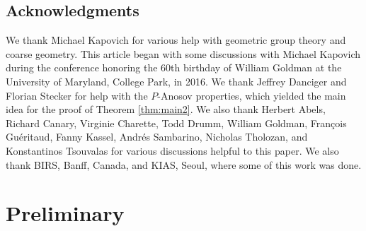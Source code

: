\subsection{Acknowledgments}
We thank Michael Kapovich for various help with geometric group theory and coarse geometry. This article began with some discussions with Michael Kapovich during the conference honoring the 60th birthday of William Goldman at the University of Maryland, College Park, in 2016. 
We thank Jeffrey Danciger and Florian Stecker for help with the $P$-Anosov properties, which yielded the main idea for the proof of Theorem \ref{thm:main2}. 
%
%
We also thank Herbert Abels, Richard Canary, Virginie Charette, Todd Drumm,
William Goldman, Fran\c{c}ois Gu\'eritaud, Fanny Kassel, 
Andr\'es Sambarino, Nicholas Tholozan, and Konstantinos Tsouvalas for various discussions helpful to this paper. 
We also thank BIRS, Banff, Canada, and KIAS, Seoul, where some of this work was done.

\section{ Preliminary} \label{sec:preliminary-p1} 

